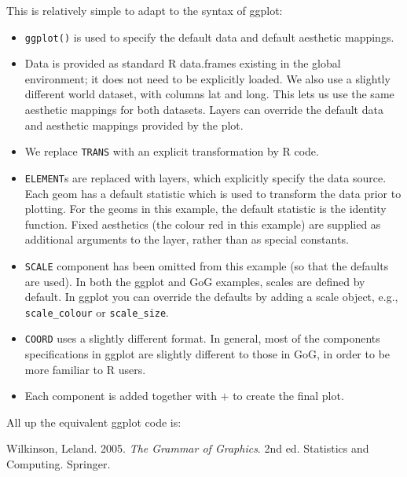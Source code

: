This is relatively simple to adapt to the syntax of ggplot:

\begin{itemize}
\itemsep1pt\parskip0pt
\item
  \texttt{ggplot()} is used to specify the default data and default
  aesthetic mappings.
\item
  Data is provided as standard R data.frames existing in the global
  environment; it does not need to be explicitly loaded. We also use a
  slightly different world dataset, with columns lat and long. This lets
  us use the same aesthetic mappings for both datasets. Layers can
  override the default data and aesthetic mappings provided by the plot.
\item
  We replace \texttt{TRANS} with an explicit transformation by R code.
\item
  \texttt{ELEMENT}s are replaced with layers, which explicitly specify
  the data source. Each geom has a default statistic which is used to
  transform the data prior to plotting. For the geoms in this example,
  the default statistic is the identity function. Fixed aesthetics (the
  colour red in this example) are supplied as additional arguments to
  the layer, rather than as special constants.
\item
  \texttt{SCALE} component has been omitted from this example (so that
  the defaults are used). In both the ggplot and GoG examples, scales
  are defined by default. In ggplot you can override the defaults by
  adding a scale object, e.g., \texttt{scale\_colour} or
  \texttt{scale\_size}.
\item
  \texttt{COORD} uses a slightly different format. In general, most of
  the components specifications in ggplot are slightly different to
  those in GoG, in order to be more familiar to R users.
\item
  Each component is added together with \(+\) to create the final plot.
\end{itemize}

All up the equivalent ggplot code is:

\begin{Shaded}
\begin{Highlighting}[]
\StringTok{ }
   \StringTok{ }\NormalTok{))}

\StringTok{ }
\StringTok{  }\NormalTok{(} 
\StringTok{  }\NormalTok{(}\NormalTok{(}  \NormalTok{) +}
\StringTok{  }\NormalTok{(} \NormalTok{)}
\end{Highlighting}
\end{Shaded}

Wilkinson, Leland. 2005. \emph{The Grammar of Graphics}. 2nd ed.
Statistics and Computing. Springer.
